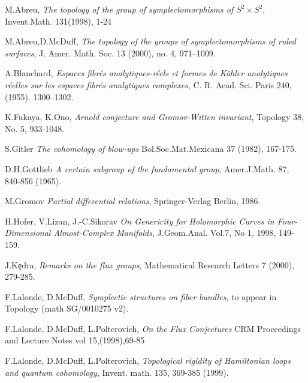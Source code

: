 \documentclass[a4paper,14pt]{article}
\numberwithin{equation}{section}
\begin{document}
\begin{thebibliography}{ccccccc}

      M.Abreu, {\it  The topology of the group of symplectomorphisms of
       $S^2\times S^2$}, Invent.Math. 131(1998), 1-24


      M.Abreu,D.McDuff, {\it The topology of the groups of symplectomorphisms
      of ruled surfaces},  J. Amer. Math. Soc. 13 (2000),  no. 4, 971--1009. 


       A.Blanchard, {\it Espaces fibr\' es analytiques-r\' eels et formes de 
       K\" ahler analytiques r\' eelles sur les espaces fibr\' es analytiques 
       complexes}, C. R. Acad. Sci. Paris 240, (1955). 1300--1302.

      K.Fukaya, K.Ono, {\it Arnold conjecture and Gromov-Witten invariant}, 
      Topology 38, No. 5, 933-1048.

      S.Gitler {\it The cohomology of blow-ups} Bol.Soc.Mat.Mexicana 37
      (1982), 167-175.


      D.H.Gottlieb {\it A certain subgroup of the fundamental group},
      Amer.J.Math. 87, 840-856 (1965).



      M.Gromov {\it Partial differential relations}, Springer-Verlag Berlin,
      1986.

      H.Hofer, V.Lizan, J.-C.Sikorav {\it On Genericity for Holomorphic
      Curves in Four-Dimensional Almost-Complex Manifolds},
      J.Geom.Anal. Vol.7, No 1, 1998, 149-159.

    J.K\c edra, {\it Remarks on the flux groups}, Mathematical
    Research Letters 7 (2000), 279-285.



     F.Lalonde, D.McDuff, {\it Symplectic structures on fiber bundles}, 
     to appear in Topology (math SG/0010275 v2).

     F.Lalonde, D.McDuff, L.Polterovich, {\it On the Flux Conjectures}
     CRM Proceedings and Lecture Notes vol 15,(1998),69-85



     F.Lalonde, D.McDuff, L.Polterovich, {\it Topological rigidity of
     Hamiltonian loops and quantum cohomology}, Invent. math. 135,
     369-385 (1999).





\end{thebibliography}
\end{document}
